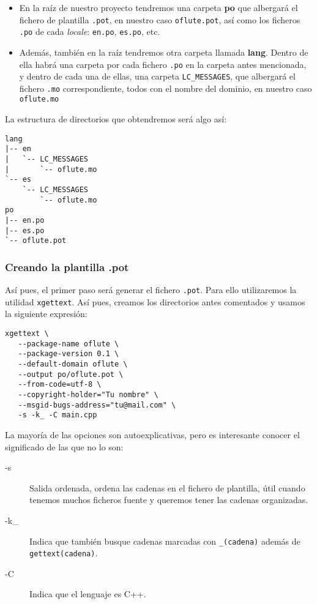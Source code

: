 \begin{itemize}
\item En la raíz de nuestro proyecto tendremos una carpeta \textbf{po}
  que albergará el fichero de plantilla \texttt{.pot}, en nuestro caso
  \texttt{oflute.pot}, así como los ficheros \texttt{.po} de cada
  \textit{locale}: \texttt{en.po}, \texttt{es.po}, etc.
\item Además, también en la raíz tendremos otra carpeta llamada
  \textbf{lang}. Dentro de ella habrá una carpeta por cada fichero
  \texttt{.po} en la carpeta antes mencionada, y dentro de cada una de
  ellas, una carpeta \texttt{LC\_MESSAGES}, que albergará el fichero
  \texttt{.mo} correspondiente, todos con el nombre del dominio, en
  nuestro caso \texttt{oflute.mo}
\end{itemize}

La estructura de directorios que obtendremos será algo así:

\begin{verbatim}
lang
|-- en
|   `-- LC_MESSAGES
|       `-- oflute.mo
`-- es
    `-- LC_MESSAGES
        `-- oflute.mo
po
|-- en.po
|-- es.po
`-- oflute.pot

\end{verbatim}

\subsubsection{Creando la plantilla .pot}

Así pues, el primer paso será generar el fichero \texttt{.pot}. Para ello
utilizaremos la utilidad \texttt{xgettext}. Así pues, creamos los directorios
antes comentados y usamos la siguiente expresión:

\begin{verbatim}
xgettext \
   --package-name oflute \
   --package-version 0.1 \
   --default-domain oflute \
   --output po/oflute.pot \
   --from-code=utf-8 \
   --copyright-holder="Tu nombre" \
   --msgid-bugs-address="tu@mail.com" \
   -s -k_ -C main.cpp
\end{verbatim}

La mayoría de las opciones son autoexplicativas, pero es interesante
conocer el significado de las que no lo son:

\begin{description}
\item[-s] Salida ordenada, ordena las cadenas en el fichero de
  plantilla, útil cuando tenemos muchos ficheros fuente y queremos
  tener las cadenas organizadas.
\item[-k\_] Indica que también busque cadenas marcadas con
  \texttt{\_(cadena)} además de \texttt{gettext(cadena)}.
\item[-C] Indica que el lenguaje es C++.
\end{description}


